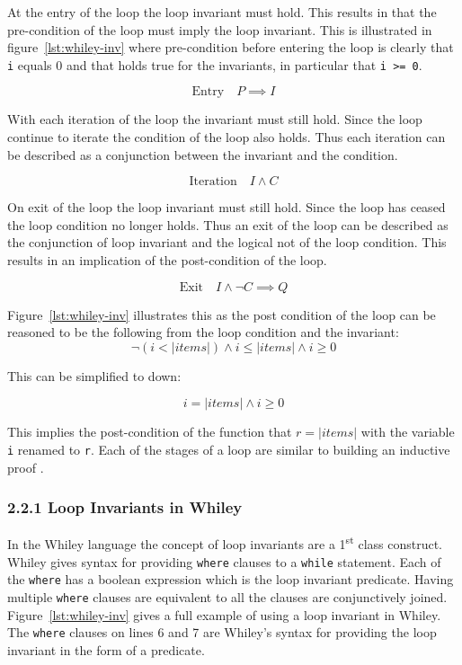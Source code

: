 \documentclass[11pt, a4paper, twoside, openright]{report}
\newcommand{\code}[1]{\texttt{#1}}
\begin{document}
At the entry of the loop the loop invariant must hold.
This results in that the pre-condition of the loop must imply
the loop invariant.
This is illustrated in figure~\ref{lst:whiley-inv} where pre-condition
before entering the loop is clearly that \code{i} equals 0 and that holds
true for the invariants, in particular that \code{i >= 0}.

$$\text{Entry} \quad P \implies I$$

With each iteration of the loop the invariant must still hold.
Since the loop continue to iterate the condition of the loop
also holds. Thus each iteration can be described as a conjunction
between the invariant and the condition.

$$\text{Iteration} \quad I \wedge C $$

On exit of the loop the loop invariant must still hold.
Since the loop has ceased the loop condition no longer
holds. Thus an exit of the loop can be described
as the conjunction of loop invariant and the logical
not of the loop condition.
This results in an implication of the post-condition of the
loop.

$$\text{Exit} \quad I \wedge \neg{C} \implies Q$$

Figure~\ref{lst:whiley-inv} illustrates this as the
post condition of the loop can be reasoned to be the following
from the loop condition and the invariant:
$$\neg{ ( i < |items| ) } \wedge i \leq |items| \wedge i \geq 0$$

This can be simplified to down:

$$ i = |items| \wedge i \geq 0$$

This implies the post-condition of the function that $r = |items|$ with
the variable \code{i} renamed to \code{r}.
Each of the stages of a loop are similar to building an inductive proof \cite{invarints-classifiction}.

\subsubsection*{2.2.1 Loop Invariants in Whiley}

In the Whiley language the concept of loop invariants are a 1\textsuperscript{st} class
construct.
Whiley gives syntax for providing \code{where} clauses to a \code{while}
statement.
Each of the \code{where} has a boolean expression which is the loop
invariant predicate.
Having multiple \code{where} clauses are equivalent to all the clauses are
conjunctively joined.
Figure~\ref{lst:whiley-inv} gives a full example of using a loop invariant
in Whiley. The \code{where} clauses on lines 6 and 7 are Whiley's syntax for
providing the loop invariant in the form of a predicate.
\end{document}
